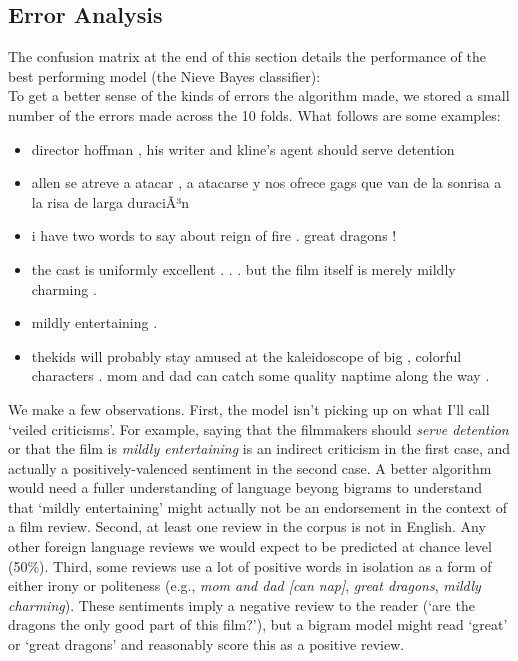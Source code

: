 \documentclass{amsart}
\theoremstyle{definition}
\theoremstyle{remark}
\numberwithin{equation}{section}
\begin{document}
\subsection{Error Analysis}

The confusion matrix at the end of this section details the performance of the
best performing model (the Nieve Bayes classifier): \\

To get a better sense of the kinds of errors the algorithm made, we stored a small
number of the errors made across the 10 folds. What follows are some examples: \\

\begin{itemize}
    \item{director hoffman , his writer and kline's agent should serve detention}
    \item{allen se atreve a atacar , a atacarse y nos ofrece gags que van de la sonrisa a la risa de larga duraciÃ³n}
    \item{i have two words to say about reign of fire . great dragons ! }
    \item{the cast is uniformly excellent . . . but the film itself is merely mildly charming .}
    \item{mildly entertaining .}
    \item{thekids will probably stay amused at the kaleidoscope of big , colorful characters . mom and dad can catch some quality naptime along the way .}
\end{itemize}

We make a few observations. First, the model isn't picking up on what I'll call
`veiled criticisms'. For example, saying that the filmmakers should
\textit{serve detention} or that the film is \textit{mildly entertaining} is
an indirect criticism in the first case, and actually a positively-valenced
sentiment in the second case. A better algorithm would need a fuller understanding
of language beyong bigrams to understand that `mildly entertaining' might actually
not be an endorsement in the context of a film review. Second, at least one review
in the corpus is not in English. Any other foreign language reviews we would expect
to be predicted at chance level (50\%). Third, some reviews use a lot of positive
words in isolation as a form of either irony or politeness (e.g.,
\textit{mom and dad [can nap]}, \textit{great dragons}, \textit{mildly charming}).
These sentiments imply a negative review to the reader (`are the dragons the
only good part of this film?'), but a bigram model might read `great' or `great
dragons' and reasonably score this as a positive review. \\
\end{document}
